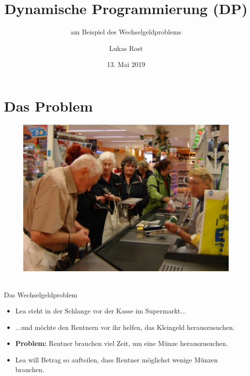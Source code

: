 \documentclass[hyphens,compress,fleqn]{beamer}
\begin{document}
	\title{Dynamische Programmierung (DP)}
	\subtitle{am Beispiel des Wechselgeldproblems}
	\author{Lukas Rost}
	\date{13. Mai 2019}
	
	\begin{frame}[plain]
	\titlepage
	\end{frame}
	
	\section{Das Problem}
	\begin{frame}
		\begin{figure}
			\includegraphics[width=\textwidth]{pics/warteschlange}
		\end{figure}
	\end{frame}

	\begin{frame}{{\footnotesize\insertsectionhead\\}Das Wechselgeldproblem}
		\begin{itemize}[<+->]
			\item Lea steht in der Schlange vor der Kasse im Supermarkt...
			\item ...und möchte den Rentnern vor ihr helfen, das Kleingeld herauszusuchen.
			\item \textbf{Problem:} Rentner brauchen viel Zeit, um eine Münze herauszusuchen.
			\item Lea will Betrag so aufteilen, dass Rentner möglichst wenige Münzen brauchen.
		\end{itemize}
	\end{frame}
\end{document}

